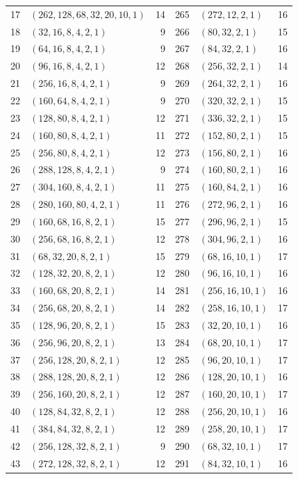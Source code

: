 \begin{longtable}{@{}rlr@{\hspace{12mm}}rlr@{}}
17 & $(262,128,68,32,20,10,1)$ & 14 & 265 & $(272,12,2,1)$ & 16\\
18 & $(32,16,8,4,2,1)$ & 9 & 266 & $(80,32,2,1)$ & 15\\
19 & $(64,16,8,4,2,1)$ & 9 & 267 & $(84,32,2,1)$ & 16\\
20 & $(96,16,8,4,2,1)$ & 12 & 268 & $(256,32,2,1)$ & 14\\
21 & $(256,16,8,4,2,1)$ & 9 & 269 & $(264,32,2,1)$ & 16\\
22 & $(160,64,8,4,2,1)$ & 9 & 270 & $(320,32,2,1)$ & 15\\
23 & $(128,80,8,4,2,1)$ & 12 & 271 & $(336,32,2,1)$ & 15\\
24 & $(160,80,8,4,2,1)$ & 11 & 272 & $(152,80,2,1)$ & 15\\
25 & $(256,80,8,4,2,1)$ & 12 & 273 & $(156,80,2,1)$ & 16\\
26 & $(288,128,8,4,2,1)$ & 9 & 274 & $(160,80,2,1)$ & 16\\
27 & $(304,160,8,4,2,1)$ & 11 & 275 & $(160,84,2,1)$ & 16\\
28 & $(280,160,80,4,2,1)$ & 11 & 276 & $(272,96,2,1)$ & 16\\
29 & $(160,68,16,8,2,1)$ & 15 & 277 & $(296,96,2,1)$ & 15\\
30 & $(256,68,16,8,2,1)$ & 12 & 278 & $(304,96,2,1)$ & 16\\
31 & $(68,32,20,8,2,1)$ & 15 & 279 & $(68,16,10,1)$ & 17\\
32 & $(128,32,20,8,2,1)$ & 12 & 280 & $(96,16,10,1)$ & 16\\
33 & $(160,68,20,8,2,1)$ & 14 & 281 & $(256,16,10,1)$ & 16\\
34 & $(256,68,20,8,2,1)$ & 14 & 282 & $(258,16,10,1)$ & 17\\
35 & $(128,96,20,8,2,1)$ & 15 & 283 & $(32,20,10,1)$ & 16\\
36 & $(256,96,20,8,2,1)$ & 13 & 284 & $(68,20,10,1)$ & 17\\
37 & $(256,128,20,8,2,1)$ & 12 & 285 & $(96,20,10,1)$ & 17\\
38 & $(288,128,20,8,2,1)$ & 12 & 286 & $(128,20,10,1)$ & 16\\
39 & $(256,160,20,8,2,1)$ & 12 & 287 & $(160,20,10,1)$ & 17\\
40 & $(128,84,32,8,2,1)$ & 12 & 288 & $(256,20,10,1)$ & 16\\
41 & $(384,84,32,8,2,1)$ & 12 & 289 & $(258,20,10,1)$ & 17\\
42 & $(256,128,32,8,2,1)$ & 9 & 290 & $(68,32,10,1)$ & 17\\
43 & $(272,128,32,8,2,1)$ & 12 & 291 & $(84,32,10,1)$ & 16\\

\end{longtable}
